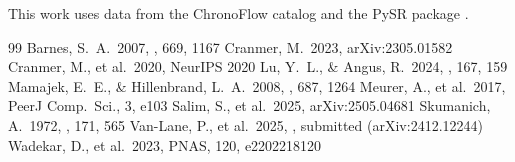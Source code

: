 \documentclass[RNAAS]{aastex7}
\begin{document}
\begin{acknowledgments}
This work uses data from the ChronoFlow catalog \citep{VanLane2025} and the PySR package \citep{Cranmer2023}.
\end{acknowledgments}

\begin{thebibliography}{99}
 Barnes, S.~A.\ 2007, \apj, 669, 1167
 Cranmer, M.\ 2023, arXiv:2305.01582
 Cranmer, M., et al.\ 2020, NeurIPS 2020
 Lu, Y.~L., \& Angus, R.\ 2024, \aj, 167, 159
 Mamajek, E.~E., \& Hillenbrand, L.~A.\ 2008, \apj, 687, 1264
 Meurer, A., et al.\ 2017, PeerJ Comp.\ Sci., 3, e103
 Salim, S., et al.\ 2025, arXiv:2505.04681
 Skumanich, A.\ 1972, \apj, 171, 565
 Van-Lane, P., et al.\ 2025, \apj, submitted (arXiv:2412.12244)
 Wadekar, D., et al.\ 2023, PNAS, 120, e2202218120
\end{thebibliography}
\end{document}
